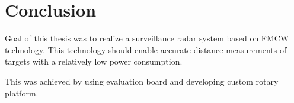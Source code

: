 \chapter*{Conclusion}

Goal of this thesis was to realize a surveillance radar system based on FMCW technology.
This technology should enable accurate distance measurements of targets with a relatively low power consumption.

This was achieved by using \sidar evaluation board and developing custom rotary platform.



